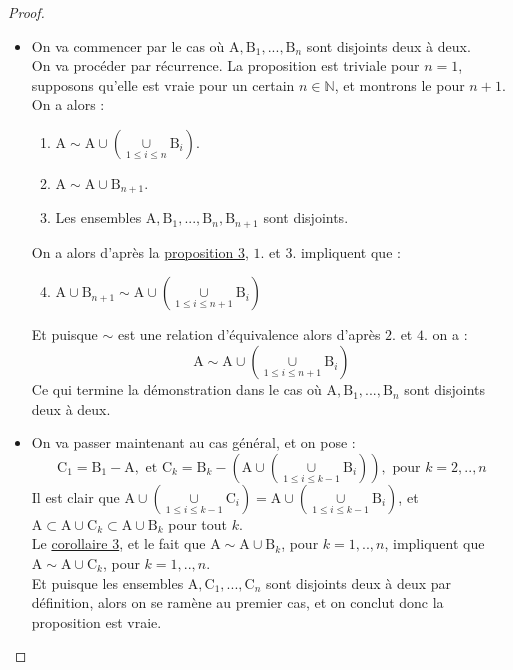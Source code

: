 \begin{proof}
  \hfill
  \begin{itemize}
    \item  On va commencer par le cas où $\mathrm{A},\mathrm{B}_1,...,\mathrm{B}_n$ sont disjoints deux à deux.\\
     On va procéder par récurrence. La proposition est triviale pour $n=1$, supposons qu'elle est vraie pour un certain $n \in \mathbb{N}$, et montrons le pour $n+1$. On a alors :
     \begin{enumerate}
       \item $\mathrm{A} \sim \mathrm{A} \cup \left(\underset{1\le i \le n}{\cup}\mathrm{B}_i\right)$.
       \item $\mathrm{A} \sim \mathrm{A} \cup \mathrm{B}_{n+1}$.
       \item Les ensembles $\mathrm{A},\mathrm{B}_1,...,\mathrm{B}_n, \mathrm{B}_{n+1}$ sont disjoints.
     \end{enumerate}
     On a alors d'après la \hyperref[p3]{proposition 3}, $1.$ et $3.$ impliquent que :
    \begin{enumerate}
      \setcounter{enumi}{3}
      \item $\mathrm{A} \cup \mathrm{B}_{n+1} \sim \mathrm{A} \cup \left(\underset{1\le i \le n+1}{\cup}\mathrm{B}_i\right)$
    \end{enumerate}
    Et puisque $\sim$ est une relation d'équivalence alors d'après $2.$ et $4.$ on a : $$\mathrm{A} \sim \mathrm{A} \cup \left(\underset{1\le i \le n+1}{\cup}\mathrm{B}_i\right)$$
    Ce qui termine la démonstration dans le cas où $\mathrm{A},\mathrm{B}_1,...,\mathrm{B}_n$ sont disjoints deux à deux.
    \item On va passer maintenant au cas général, et on pose :
    $$\mathrm{C}_1 = \mathrm{B}_1-\mathrm{A}, \text{ et } \mathrm{C}_k = \mathrm{B}_k - \left(\mathrm{A} \cup \left(\underset{1\le i \le k-1}{\cup}\mathrm{B}_i\right)\right), \text{ pour } k=2,..,n$$
    Il est clair que $\mathrm{A} \cup \left(\underset{1\le i \le k-1}{\cup}\mathrm{C}_i\right) = \mathrm{A} \cup \left(\underset{1\le i \le k-1}{\cup}\mathrm{B}_i\right)$, et $\mathrm{A} \subset \mathrm{A} \cup \mathrm{C}_k \subset \mathrm{A} \cup \mathrm{B}_k$ pour tout $k$.\\
    Le \hyperref[c2]{corollaire 3}, et le fait que $\mathrm{A} \sim \mathrm{A} \cup \mathrm{B}_k$, pour $k=1,..,n$, impliquent que $\mathrm{A} \sim \mathrm{A} \cup \mathrm{C}_k$, pour $k=1,..,n$.\\
    Et puisque les ensembles $\mathrm{A},\mathrm{C}_1,...,\mathrm{C}_n$ sont disjoints deux à deux par définition, alors on se ramène au premier cas, et on conclut donc la proposition est vraie.
  \end{itemize}
\end{proof}


